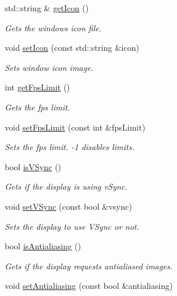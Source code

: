 \begin{DoxyCompactItemize}
std\+::string \& \hyperlink{classflounder_1_1display_ac0506da092e74addb30ca2ecb9b5a0d5}{get\+Icon} ()
\begin{DoxyCompactList}\small\item\em Gets the window\textquotesingle{}s icon file. \end{DoxyCompactList}\item 
void \hyperlink{classflounder_1_1display_a49ba8d850f666496fabf9133d01091ab}{set\+Icon} (const std\+::string \&icon)
\begin{DoxyCompactList}\small\item\em Sets window icon image. \end{DoxyCompactList}\item 
int \hyperlink{classflounder_1_1display_aea9d5368ecd65c53e634d1cec52f9718}{get\+Fps\+Limit} ()
\begin{DoxyCompactList}\small\item\em Gets the fps limit. \end{DoxyCompactList}\item 
void \hyperlink{classflounder_1_1display_a7d24403c951e5a043675c3e7b02c3c34}{set\+Fps\+Limit} (const int \&fps\+Limit)
\begin{DoxyCompactList}\small\item\em Sets the fps limit. -\/1 disables limits. \end{DoxyCompactList}\item 
bool \hyperlink{classflounder_1_1display_a75f2ff773d4d26740df8531b20b0a091}{is\+V\+Sync} ()
\begin{DoxyCompactList}\small\item\em Gets if the display is using v\+Sync. \end{DoxyCompactList}\item 
void \hyperlink{classflounder_1_1display_a172501e1e99cde228d86fab59a3a636b}{set\+V\+Sync} (const bool \&vsync)
\begin{DoxyCompactList}\small\item\em Sets the display to use V\+Sync or not. \end{DoxyCompactList}\item 
bool \hyperlink{classflounder_1_1display_ab36d40e6a3be5272853e13e45da750b8}{is\+Antialiasing} ()
\begin{DoxyCompactList}\small\item\em Gets if the display requests antialiased images. \end{DoxyCompactList}\item 
void \hyperlink{classflounder_1_1display_ae9a340bfa09dfd6d08ebc0d21b4c77b0}{set\+Antialiasing} (const bool \&antialiasing)

\end{DoxyCompactItemize}
